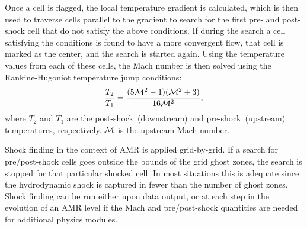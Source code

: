 Once a cell is flagged, the local temperature gradient is calculated, which is 
then used to traverse cells parallel to the gradient to search for the first
pre- and post-shock cell that do not satisfy the above conditions.  If during
the search a cell satisfying the conditions is found to have a more convergent
flow, that cell is marked as the center, and the search is started again. Using the 
temperature values from each of these cells, the Mach number is then solved
using the Rankine-Hugoniot temperature jump conditions:
\begin{equation}
\frac{T_2}{T_1} = \frac{(5\Mach^2 - 1)(\Mach^2 + 3)}{16\Mach^2},
\end{equation}
where $T_2$ and $T_1$ are the post-shock~(downstream) and pre-shock~(upstream)
temperatures, respectively. $\mathcal{M}$ is the upstream Mach number.  

Shock finding in the context of AMR is applied grid-by-grid.  If a search for
pre/post-shock cells goes outside the bounds of the grid ghost zones, the
search is stopped for that particular shocked cell. In most situations this is
adequate since the hydrodynamic shock is captured in fewer than the number of
ghost zones.  Shock finding can be run either upon data output, or at each step
in the evolution of an AMR level if the Mach and pre/post-shock quantities are
needed for additional physics modules.

